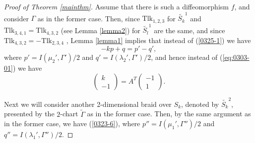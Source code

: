\documentclass[a4paper,11pt]{amsart}
\numberwithin{equation}{section}
\begin{document}
\begin{proof}[Proof of Theorem \ref{mainthm}]
\begin{sloppypar}
Assume that there is such a diffeomorphism $f$, and consider $\Gamma$ as in the former case. Then, since $\mathrm{Tlk}_{1,2,3}$ for $\widetilde{S_k}^1$ and $\mathrm{Tlk}_{3,4,1}=\mathrm{Tlk}_{4,3,2}$ (see Lemma \ref{lemma2}) for $\widetilde{S_l}^1$ are the same, and since $\mathrm{Tlk}_{4,3,2}=-\mathrm{Tlk}_{2,3,4}$ \cite{CJKLS}, Lemma \ref{lemma1} implies that instead of (\ref{0325-1}) 
we have
\begin{equation}\label{6-10}
-kp+q=p'-q', 
\end{equation}
where $p'=I(\mu_2', \Gamma')/2$ and $q'=I(\lambda_2', \Gamma')/2$, 
and hence instead of (\ref{eq:0303-01}) we have
\begin{equation}
\begin{pmatrix}\label{0327-1}
k\\-1
\end{pmatrix}
=A^T\begin{pmatrix}
-1\\1
\end{pmatrix}. 
\end{equation}

 Next we will consider another 2-dimensional braid over $S_k$, denoted by $\widetilde{S_k}^2$, presented by the $2$-chart $\widetilde{\Gamma}$ as in the former case.  
Then, by the same argument as in the former case, we have 
(\ref{0323-6}), where $p''=I(\mu_1', \Gamma'')/2$ and $q''=I(\lambda_1', \Gamma'')/2$.


\end{sloppypar}
\end{proof}
\end{document}
